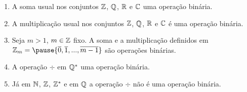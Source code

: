 \documentclass{beamer}
\begin{document}
    \begin{frame}
        \begin{exemplos}
            \begin{enumerate}[label={\arabic*})]
                \item A soma usual \pause nos conjuntos $\mathbb{Z}$, \pause $\mathbb{Q}$, \pause $\mathbb{R}$ \pause e $\mathbb{C}$  uma opera{\c c}{\~a}o bin{\'a}ria.\pause

                \vspace{.3cm}

                \item A multiplica\c{c}\~ao usual \pause nos conjuntos $\mathbb{Z}$, \pause $\mathbb{Q}$, \pause $\mathbb{R}$ \pause e $\mathbb{C}$ {\'e} uma opera{\c c}{\~a}o bin{\'a}ria.\pause

                \vspace{.3cm}

                \item Seja $m > 1$, \pause $m \in \mathbb{Z}$ fixo. \pause A soma \pause e a multiplica\c{c}\~ao definidos em $\z_m = \pause \{\overline{0}, \overline{1}, ..., \overline{m-1}\}$ \pause s\~ao opera\c{c}\~oes bin\'arias.\pause

                \vspace{.3cm}

                \item A opera\c{c}\~ao $\div$ \pause em $\mathbb{Q}^{*}$  uma opera{\c c}{\~a}o bin{\'a}ria.\pause

                \vspace{.3cm}

                \item J\'a em $\mathbb{N}$, \pause $\mathbb{Z}$, \pause $\mathbb{Z}^{*}$ \pause e em $\mathbb{Q}$ \pause a opera\c{c}\~ao $\div$ \pause n{\~a}o {\'e} uma opera{\c c}{\~a}o bin{\'a}ria.\pause

                \vspace{.3cm}

            \end{enumerate}
        \end{exemplos}
    \end{frame}
\end{document}
